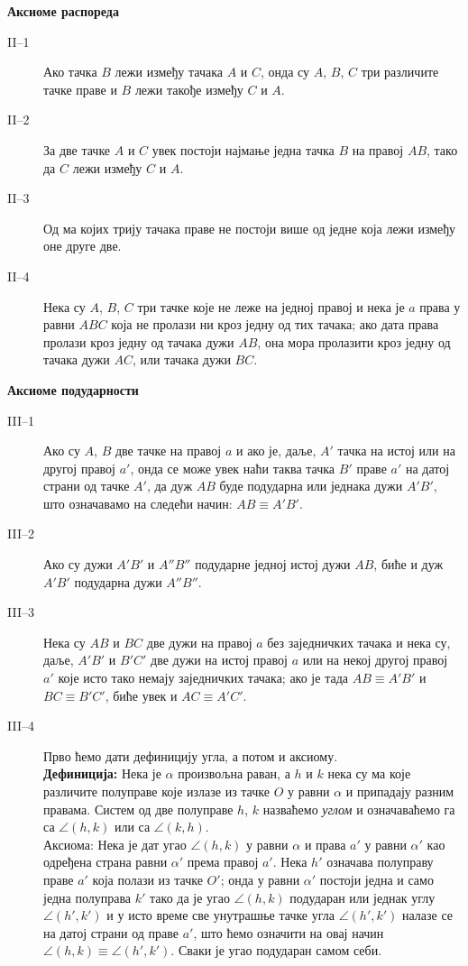 \noindent \textbf{Аксиоме распореда}

\begin{description}
\item[II--1] Ако тачка $B$ лежи између тачака $A$ и $C$, онда су $A$,
  $B$, $C$ три различите тачке праве и $B$ лежи такође између $C$ и
  $A$.
\item[II--2] За две тачке $A$ и $C$ увек постоји најмање једна тачка
  $B$ на правој $AB$, тако да $C$ лежи између $C$ и $A$.
\item[II--3] Од ма којих трију тачака праве не постоји више од једне
  која лежи између оне друге две.
\item[II--4] Нека су $A$, $B$, $C$ три тачке које не леже на једној
  правој и нека је $a$ права у равни $ABC$ која не пролази ни кроз
  једну од тих тачака; ако дата права пролази кроз једну од тачака
  дужи $AB$, она мора пролазити кроз једну од тачака дужи $AC$, или
  тачака дужи $BC$.
\end{description}  

\noindent \textbf{Аксиоме подударности}

\begin{description}
\item[III--1] Ако су $A$, $B$ две тачке на правој $a$ и ако је, даље,
  $A'$ тачка на истој или на другој правој $a'$, онда се може увек
  наћи таква тачка $B'$ праве $a'$ на датој страни од тачке $A'$, да
  дуж $AB$ буде подударна или једнака дужи $A'B'$, што означавамо на
  следећи начин: $AB \equiv A'B'$.
\item[III--2] Ако су дужи $A'B'$ и $A''B''$ подударне једној истој
  дужи $AB$, биће и дуж $A'B'$ подударна дужи $A''B''$.
\item[III--3] Нека су $AB$ и $BC$ две дужи на правој $a$ без
  заједничких тачака и нека су, даље, $A'B'$ и $B'C'$ две дужи на
  истој правој $a$ или на некој другој правој $a'$ које исто тако
  немају заједничких тачака; ако је тада $AB \equiv A'B'$ и $BC \equiv
  B'C'$, биће увек и $AC \equiv A'C'$.
\item[III--4] Прво ћемо дати дефиницију угла, а потом и
  аксиому. \\
  \textbf{Дефиниција:} Нека је $\alpha$ произвољна раван, а $h$ и $k$
  нека су ма које различите полуправе које излазе из тачке $O$ у равни
  $\alpha$ и припадају разним правама. Систем од две полуправе $h$,
  $k$ назваћемо \emph{углом} и означаваћемо га са $\angle(h, k)$ или
  са $\angle(k, h)$.\\
  Аксиома: Нека је дат угао $\angle(h, k)$ у равни $\alpha$ и права
  $a'$ у равни $\alpha'$ као одређена страна равни $\alpha'$ према
  правој $a'$. Нека $h'$ означава полуправу праве $a'$ која полази из
  тачке $O'$; онда у равни $\alpha'$ постоји једна и само једна
  полуправа $k'$ тако да је угао $\angle(h, k)$ подударан или једнак
  углу $\angle(h', k')$ и у исто време све унутрашње тачке угла
  $\angle(h', k')$ налазе се на датој страни од праве $a'$, што ћемо
  означити на овај начин $\angle(h, k) \equiv \angle(h', k')$. Сваки
  је угао подударан самом себи.
\end{description}

